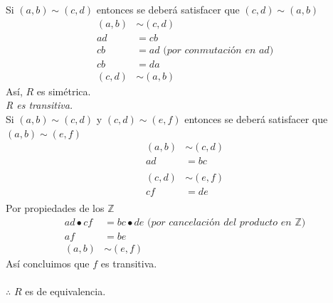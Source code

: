 \documentclass[12pt]{article}
\begin{document}
Si $(a, b) \sim (c, d)$ entonces se deberá satisfacer que $(c, d) \sim (a, b)$
\begin{align*}
    (a, b) &\sim (c, d)\\
    ad &= cb \\
    cb &= ad \textit{ (por conmutación en ad)}\\ 
    cb &= da\\
    (c, d) &\sim (a, b)
\end{align*}
Así, $R$ es simétrica.\\

\textit{R es transitiva.}\\

Si $(a, b) \sim (c, d)$ y $(c, d) \sim (e, f)$ entonces se deberá satisfacer que $(a, b) \sim (e, f)$
\begin{align*}
    (a, b) &\sim (c, d)\\
    ad &= bc\\
    \\
    (c, d) &\sim (e, f)\\
    cf &= de\\
\end{align*}
Por propiedades de los $\mathbb{Z}$
\begin{align*}
    ad \bullet cf &= bc \bullet de \textit{ (por cancelación del producto en $\mathbb{Z}$)}\\
    af &= be\\
    (a, b) &\sim (e, f)
\end{align*}
Así concluimos que $f$ es transitiva.\\
\\
$\therefore$ $R$ es de equivalencia.
\end{document}
